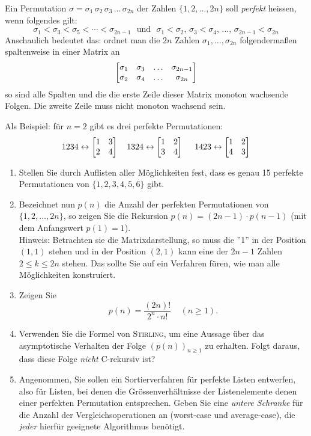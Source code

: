 Ein Permutation $\sigma=\sigma_1\,\sigma_2\, \sigma_3\,\ldots \,\sigma_{2n}$ der Zahlen
$\{1,2,\ldots,2n\}$ soll \emph{perfekt} heissen, wenn folgendes gilt:
\[
\sigma_1 < \sigma_3 < \sigma_5 < \cdots < \sigma_{2n-1}~~~\text{und}~~~
\sigma_1 < \sigma_2, \, \sigma_3 < \sigma_4 , \,   \ldots , \, \sigma_{2n-1} < \sigma_{2n}
\]
Anschaulich bedeutet das: ordnet man die $2n$ Zahlen $\sigma_1, \ldots,\sigma_{2n}$
folgenderma\ss en spaltenweise in einer Matrix an
\[
\begin{bmatrix}
\sigma_1 & \sigma_3 & \ldots & \sigma_{2n-1} \cr
\sigma_2 & \sigma_4 & \ldots & \sigma_{2n}
\end{bmatrix}
\] 
so sind alle Spalten und die die erste Zeile dieser Matrix monoton wachsende Folgen.
Die zweite Zeile muss nicht monoton wachsend sein.

Als Beispiel: für $n=2$ gibt es drei perfekte Permutationen:
\[
1234 \leftrightarrow \begin{bmatrix} 1 & 3 \cr 2 & 4 \end{bmatrix} ~~~
1324\leftrightarrow \begin{bmatrix} 1 & 2 \cr 3 & 4 \end{bmatrix} ~~~~
 1423\leftrightarrow\begin{bmatrix} 1 & 2 \cr 4 & 3 \end{bmatrix} 
\]

\begin{enumerate}
\item Stellen Sie durch Auflisten aller Möglichkeiten fest, dass es genau 15 perfekte Permutationen 
	von $\{1,2,3,4,5,6\}$ gibt.
\item Bezeichnet nun $p(n)$ die Anzahl der perfekten Permutationen von $\{1,2,\ldots,2n\}$,
	so zeigen Sie die Rekursion $p(n)= (2n-1)\cdot p(n-1)$ (mit dem Anfangswert $p(1)=1$).\\
	Hinweis: Betrachten sie die Matrixdarstellung, so muss die ''1''   in der Position $(1,1)$ stehen
	und in der Position $(2,1)$ kann eine der $2n-1$ Zahlen $2 \leq k \leq 2n$ stehen. Das sollte
	Sie auf ein Verfahren füren, wie man alle Möglichkeiten konstruiert.
\item Zeigen Sie
	\[
	p(n) = \frac{(2n)!}{2^n \cdot n!}~~~~~(n \geq 1).
	\]
\item Verwenden Sie die Formel von \textsc{Stirling}, um eine Aussage über das
	asymptotische Verhalten der Folge $(p(n))_{n  \geq 1}$ zu erhalten. Folgt daraus,
	dass diese Folge \emph{nicht} C-rekursiv ist?
\item Angenommen, Sie sollen ein Sortierverfahren für perfekte Listen entwerfen, also für 
	Listen, bei denen die Grössenverhältnisse der Listenelemente denen einer perfekten
	Permutation entsprechen. Geben Sie eine \emph{untere Schranke} für die
	Anzahl der Vergleichsoperationen an (worst-case und average-case), die \emph{jeder}
	hierfür geeignete Algorithmus benötigt.
\end{enumerate}

